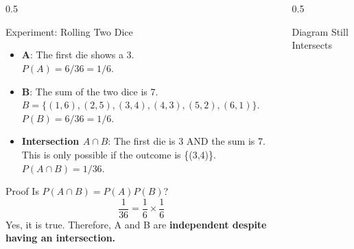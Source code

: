 \begin{frame}
    \frametitle{\ }
    \vspace{-7mm}
    \footnotesize
    \begin{columns}[T]
        \begin{column}{0.5\textwidth}
            \begin{block}{Experiment: Rolling Two Dice}
                \begin{itemize}
                    \item \textbf{A}: The first die shows a 3. \\ \(P(A) = 6/36 = 1/6\).
                    \item \textbf{B}: The sum of the two dice is 7. \\ \(B = \{(1,6), (2,5), (3,4), (4,3), (5,2), (6,1)\}\). \\ \(P(B) = 6/36 = 1/6\).
                    \item \textbf{Intersection \(A \cap B\)}: The first die is 3 AND the sum is 7. This is only possible if the outcome is \{(3,4)\}. \\ \(P(A \cap B) = 1/36\).
                \end{itemize}
            \end{block}
            \vspace{-4mm}
            \begin{block}{Proof}
                Is \(P(A \cap B) = P(A)P(B)\)?
                \[ \frac{1}{36} = \frac{1}{6} \times \frac{1}{6} \]
                Yes, it is true. Therefore, A and B are \textbf{independent despite having an intersection.}
            \end{block}
        \end{column}
        
        \begin{column}{0.5\textwidth}
            \begin{block}{Diagram Still Intersects}
                \centering
            \end{block}
        \end{column}
    \end{columns}
\end{frame}

